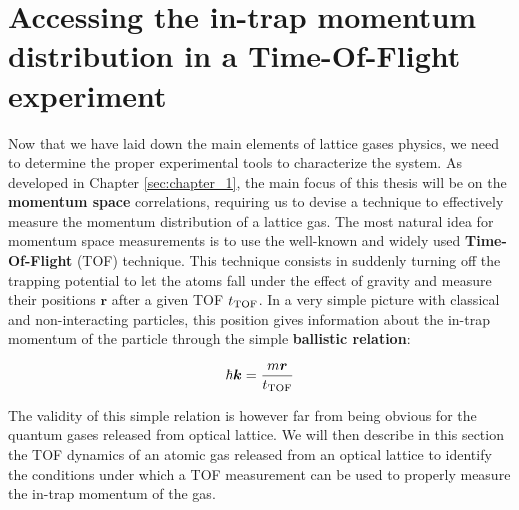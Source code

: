 \section{Accessing the in-trap momentum distribution in a Time-Of-Flight experiment}

\label{sec:ch2_TOF}

Now that we have laid down the main elements of lattice gases physics, we need to determine the proper experimental tools to characterize the system. As developed in Chapter \ref{sec:chapter_1}, the main focus of this thesis will be on the \textbf{momentum space} correlations, requiring us to devise a technique to effectively measure the momentum distribution of a lattice gas. The most natural idea for momentum space measurements is to use the well-known and widely used \textbf{Time-Of-Flight} (TOF) technique. This technique consists in suddenly turning off the trapping potential to let the atoms fall under the effect of gravity and measure their positions $\bm{r}$ after a given TOF $t_{\rm{TOF}}$. In a very simple picture with classical and non-interacting particles, this position gives information about the in-trap momentum of the particle through the simple \textbf{ballistic relation}:

\begin{equation}
    \hbar \bm{k} = \frac{m \bm{r}}{t_{\rm{TOF}}}
\end{equation}

The validity of this simple relation is however far from being obvious for the quantum gases released from optical lattice. We will then describe in this section the TOF dynamics of an atomic gas released from an optical lattice to identify the conditions under which a TOF measurement can be used to properly measure the in-trap momentum of the gas.





